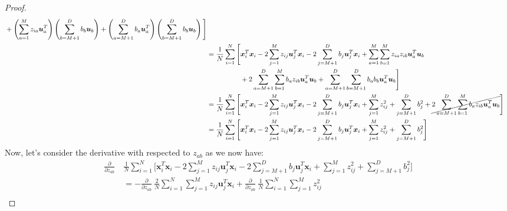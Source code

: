 \begin{proof}
\begin{align*}
\begin{aligned}[t]
            &+ \left( \sum^M_{a=1}z_{ia}\boldsymbol u_a^T \right)\left( \sum^D_{b=M+1}b_b\boldsymbol u_b \right) + \left( \sum^D_{a=M+1}b_a\boldsymbol u_a^T \right)\left( \sum^D_{b=M+1}b_b\boldsymbol u_b \right)\Bigg]  \\
        \end{aligned} \\
        &= \begin{aligned}[t] 
            \frac{1}{N}\sum^N_{i=1}\Bigg[
            &\boldsymbol x_i^T\boldsymbol x_i - 2\sum^M_{j=1}z_{ij}\boldsymbol u_j^T\boldsymbol x_i - 2\sum^D_{j=M+1}b_j\boldsymbol u_j^T\boldsymbol x_i + \sum^M_{a=1}\sum^M_{b=1}z_{ia} z_{ib}\boldsymbol u_a^T\boldsymbol u_b \\
            & + 2\sum^D_{a=M+1}\sum^M_{b=1}b_az_{ib}\boldsymbol u_a^T\boldsymbol u_b +\sum^D_{a=M+1}\sum^D_{b=M+1}b_ab_b\boldsymbol u_a^T\boldsymbol u_b\Bigg]  \\
        \end{aligned} \\
        &= \begin{aligned}[t] 
            \frac{1}{N}\sum^N_{i=1}\Bigg[
            &\boldsymbol x_i^T\boldsymbol x_i - 2\sum^M_{j=1}z_{ij}\boldsymbol u_j^T\boldsymbol x_i - 2\sum^D_{j=M+1}b_j\boldsymbol u_j^T\boldsymbol x_i + \sum^M_{j=1}z_{ij}^2  +\sum^D_{j=M+1}b_j^2 + \cancel{2\sum^D_{a=M+1}\sum^M_{b=1}b_az_{ib}\boldsymbol u_a^T\boldsymbol u_b}\Bigg]  \\
        \end{aligned} \\
        &= \begin{aligned}[t] 
            \frac{1}{N}\sum^N_{i=1}\Bigg[\boldsymbol x_i^T\boldsymbol x_i - 2\sum^M_{j=1}z_{ij}\boldsymbol u_j^T\boldsymbol x_i - 2\sum^D_{j=M+1}b_j\boldsymbol u_j^T\boldsymbol x_i + \sum^M_{j=1}z_{ij}^2  +\sum^D_{j=M+1}b_j^2\Bigg] 
        \end{aligned} \\
    \end{align*}
    Now, let's consider the derivative with respected to $z_{ab}$ as we now have:
    \begin{equation*}
    \begin{aligned}
       \frac{\partial}{\partial z_{ab}} \ &\frac{1}{N}\sum^N_{i=1} \Bigg[\boldsymbol x_i^T\boldsymbol x_i - 2\sum^M_{j=1}z_{ij}\boldsymbol u_j^T\boldsymbol x_i - 2\sum^D_{j=M+1}b_j\boldsymbol u_j^T\boldsymbol x_i + \sum^M_{j=1}z_{ij}^2  +\sum^D_{j=M+1}b_j^2\Bigg] \\ 
       &= -\frac{\partial}{\partial z_{ab}} \ \frac{2}{N}\sum^N_{i=1}\sum^M_{j=1}z_{ij}\boldsymbol u_j^T\boldsymbol x_i + \frac{\partial}{\partial z_{ab}} \ \frac{1}{N}\sum^N_{i=1}\sum^M_{j=1}z_{ij}^2 \\

\end{aligned}
\end{equation*}
\end{proof}
